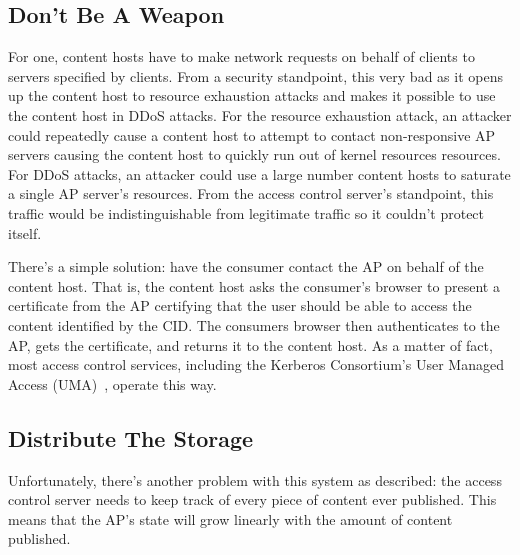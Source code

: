 \documentclass[pdftex,12pt,a4papaer]{report}
\begin{document}
\subsection{Don't Be A Weapon}

For one, content hosts have to make network requests on behalf of clients to
servers specified by clients. From a security standpoint, this very bad as it
opens up the content host to resource exhaustion attacks and makes it possible
to use the content host in DDoS attacks. For the resource exhaustion attack, an
attacker could repeatedly cause a content host to attempt to contact
non-responsive AP servers causing the content host to quickly run out of kernel
resources resources. For DDoS attacks, an attacker could use a large number
content hosts to saturate a single AP server's resources. From the access
control server's standpoint, this traffic would be indistinguishable from
legitimate traffic so it couldn't protect itself.

There's a simple solution: have the consumer contact the AP on behalf of the
content host. That is, the content host asks the consumer's browser to present a
certificate from the AP certifying that the user should be able to access the
content identified by the CID. The consumers browser then authenticates to the
AP, gets the certificate, and returns it to the content host. As a matter of
fact, most access control services, including the Kerberos Consortium's User
Managed Access (UMA)~\cite{uma}, operate this way.


\subsection{Distribute The Storage}

Unfortunately, there's another problem with this system as described: the access
control server needs to keep track of every piece of content ever published.
This means that the AP's state will grow linearly with the amount of content
published.
\end{document}
